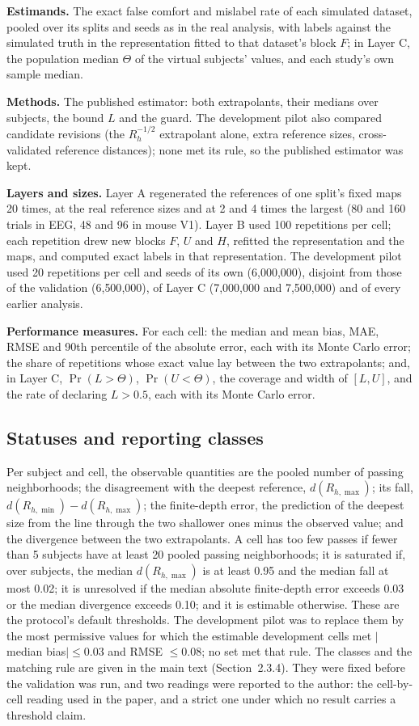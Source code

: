 \documentclass[11pt]{article}
\begin{document}
\textbf{Estimands.} The exact false comfort and mislabel rate of each simulated dataset, pooled over its splits and seeds as in the real analysis, with labels against the simulated truth in the representation fitted to that dataset's block $F$; in Layer C, the population median $\Theta$ of the virtual subjects' values, and each study's own sample median.

\textbf{Methods.} The published estimator: both extrapolants, their medians over subjects, the bound $L$ and the guard. The development pilot also compared candidate revisions (the $R_h^{-1/2}$ extrapolant alone, extra reference sizes, cross-validated reference distances); none met its rule, so the published estimator was kept.

\textbf{Layers and sizes.}
Layer A regenerated the references of one split's fixed maps 20 times, at the real reference sizes and at 2 and 4 times the largest (80 and 160 trials in EEG, 48 and 96 in mouse V1).
Layer B used 100 repetitions per cell; each repetition drew new blocks $F$, $U$ and $H$, refitted the representation and the maps, and computed exact labels in that representation.
The development pilot used 20 repetitions per cell and seeds of its own (6{,}000{,}000), disjoint from those of the validation (6{,}500{,}000), of Layer C (7{,}000{,}000 and 7{,}500{,}000) and of every earlier analysis.

\textbf{Performance measures.} For each cell: the median and mean bias, MAE, RMSE and 90th percentile of the absolute error, each with its Monte Carlo error; the share of repetitions whose exact value lay between the two extrapolants; and, in Layer C, $\Pr(L>\Theta)$, $\Pr(U<\Theta)$, the coverage and width of $[L,U]$, and the rate of declaring $L>0.5$, each with its Monte Carlo error.

\subsection{Statuses and reporting classes}
Per subject and cell, the observable quantities are the pooled number of passing neighborhoods; the disagreement with the deepest reference, $d(R_{h,\max})$; its fall, $d(R_{h,\min})-d(R_{h,\max})$; the finite-depth error, the prediction of the deepest size from the line through the two shallower ones minus the observed value; and the divergence between the two extrapolants.
A cell has too few passes if fewer than 5 subjects have at least 20 pooled passing neighborhoods; it is saturated if, over subjects, the median $d(R_{h,\max})$ is at least 0.95 and the median fall at most 0.02; it is unresolved if the median absolute finite-depth error exceeds 0.03 or the median divergence exceeds 0.10; and it is estimable otherwise.
These are the protocol's default thresholds.
The development pilot was to replace them by the most permissive values for which the estimable development cells met $|$median bias$|\le0.03$ and RMSE $\le0.08$; no set met that rule.
The classes and the matching rule are given in the main text (Section~2.3.4).
They were fixed before the validation was run, and two readings were reported to the author: the cell-by-cell reading used in the paper, and a strict one under which no result carries a threshold claim.
\end{document}
